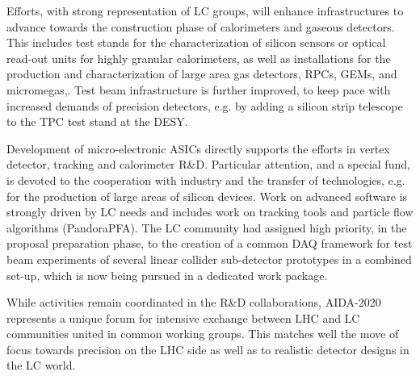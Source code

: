 Efforts, with strong representation of LC groups, will enhance infrastructures to advance towards the construction phase of calorimeters and gaseous detectors. This includes test stands for the characterization of silicon sensors or optical read-out units for highly granular calorimeters, as well as installations for the production and characterization of large area gas detectors, RPCs, GEMs, and micromegas,. Test beam infrastructure is further improved, to keep pace with increased demands of precision detectors, e.g. by adding a silicon strip telescope to the TPC test stand at the DESY.

Development of micro-electronic ASICs directly supports the efforts in vertex detector, tracking and calorimeter R\&D. Particular attention, and a special fund, is devoted to the cooperation with industry and the transfer of technologies, e.g. for the production of large areas of silicon devices. Work on advanced software is strongly driven by LC needs and includes work on tracking tools and particle flow algorithms (PandoraPFA). The LC community had assigned high priority, in the proposal preparation phase, to the creation of a common DAQ framework for test beam experiments of several linear collider sub-detector prototypes in a combined set-up, which is now being pursued in a dedicated work package.

While activities remain coordinated in the R\&D collaborations, AIDA-2020 represents a unique forum for intensive exchange between LHC and LC communities united in common working groups. This matches well the move of focus towards precision on the LHC side as well as to realistic detector designs in the LC world.
